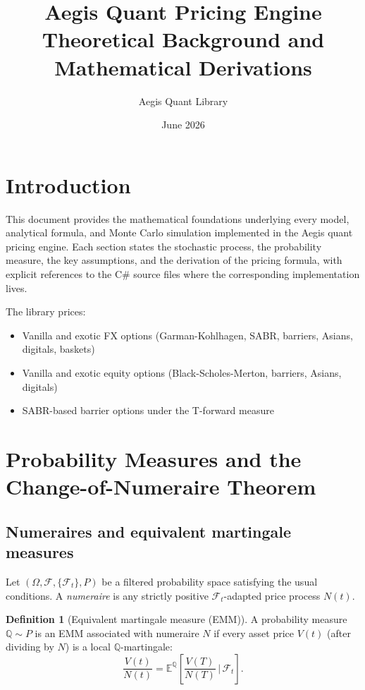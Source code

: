 \documentclass[11pt,a4paper]{article}
\title{\textbf{Aegis Quant Pricing Engine}\\[0.4em]
       \large Theoretical Background and Mathematical Derivations}
\author{Aegis Quant Library}
\date{June 2026}
\newcommand{\E}{\mathbb{E}}
\newcommand{\Q}{\mathbb{Q}}
\newcommand{\F}{\mathcal{F}}
\theoremstyle{definition}
\newtheorem{defn}{Definition}[section]
\begin{document}
\maketitle
\tableofcontents
\newpage

\section{Introduction}

This document provides the mathematical foundations underlying every model,
analytical formula, and Monte Carlo simulation implemented in the Aegis
quant pricing engine.  Each section states the stochastic process, the
probability measure, the key assumptions, and the derivation of the pricing
formula, with explicit references to the C\# source files where the
corresponding implementation lives.

The library prices:
\begin{itemize}[nosep]
  \item Vanilla and exotic FX options (Garman-Kohlhagen, SABR, barriers, Asians, digitals, baskets)
  \item Vanilla and exotic equity options (Black-Scholes-Merton, barriers, Asians, digitals)
  \item SABR-based barrier options under the T-forward measure
\end{itemize}

\section{Probability Measures and the Change-of-Numeraire Theorem}
\label{sec:measures}

\subsection{Numeraires and equivalent martingale measures}

Let $(\Omega,\F,\{\F_t\},P)$ be a filtered probability space satisfying the
usual conditions.  A \emph{numeraire} is any strictly positive $\F_t$-adapted
price process $N(t)$.

\begin{defn}[Equivalent martingale measure (EMM)]
A probability measure $\Q\sim P$ is an EMM associated with numeraire $N$ if
every asset price $V(t)$ (after dividing by $N$) is a local $\Q$-martingale:
\[
  \frac{V(t)}{N(t)} = \E^\Q\!\left[\frac{V(T)}{N(T)}\,\Big|\,\F_t\right].
\]
\end{defn}
\end{document}
